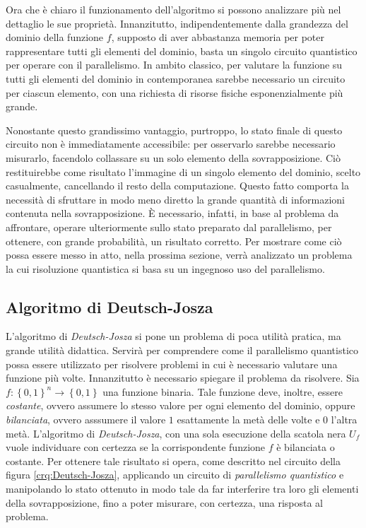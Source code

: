 Ora che è chiaro il funzionamento dell'algoritmo si possono analizzare più nel dettaglio le sue proprietà.
Innanzitutto, indipendentemente dalla grandezza del dominio della funzione $f$, supposto di aver abbastanza memoria per poter rappresentare tutti gli elementi del dominio, basta un singolo circuito quantistico per operare con il parallelismo. 
In ambito classico, per valutare la funzione su tutti gli elementi del dominio in contemporanea sarebbe necessario un circuito per ciascun elemento, con una richiesta di risorse fisiche esponenzialmente più grande.

Nonostante questo grandissimo vantaggio, purtroppo, lo stato finale di questo circuito non è immediatamente accessibile: per osservarlo sarebbe necessario misurarlo, facendolo collassare su un solo elemento della sovrapposizione.
Ciò restituirebbe come risultato l'immagine di un singolo elemento del dominio, scelto casualmente, cancellando il resto della computazione.
Questo fatto comporta la necessità di sfruttare in modo meno diretto la grande quantità di informazioni contenuta nella sovrapposizione.
È necessario, infatti, in base al problema da affrontare, operare ulteriormente sullo stato preparato dal parallelismo, per ottenere, con grande probabilità, un risultato corretto.
Per mostrare come ciò possa essere messo in atto, nella prossima sezione, verrà analizzato un problema la cui risoluzione quantistica si basa su un ingegnoso uso del parallelismo.

\subsection{Algoritmo di Deutsch-Josza}\label{sec:Deutsch-Josza}
L'algoritmo di \textit{Deutsch-Josza} si pone un problema di poca utilità pratica, ma grande utilità didattica.
Servirà per comprendere come il parallelismo quantistico possa essere utilizzato per risolvere problemi in cui è necessario valutare una funzione più volte.
Innanzitutto è necessario spiegare il problema da risolvere.
Sia $f:\left\{0,1\right\}^n \to \left\{0,1\right\}$ una funzione binaria.
Tale funzione deve, inoltre, essere \textit{costante}, ovvero assumere lo stesso valore per ogni elemento del dominio, oppure \textit{bilanciata}, ovvero asssumere il valore $1$ esattamente la metà delle volte e $0$ l'altra metà.
L'algoritmo di \textit{Deutsch-Josza}, con una sola esecuzione della scatola nera $U_f$ vuole individuare con certezza se la corrispondente funzione $f$ è bilanciata o costante.
Per ottenere tale risultato si opera, come descritto nel circuito della figura \ref{crq:Deutsch-Josza}, applicando un circuito di \textit{parallelismo quantistico} e manipolando lo stato ottenuto in modo tale da far interferire tra loro gli elementi della sovrapposizione, fino a poter misurare, con certezza, una risposta al problema.

